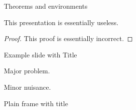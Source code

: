 \documentclass{beamer}
\begin{document}
\begin{frame}{Theorems and environments}
\begin{theorem}
This presentation is essentially useless.
\end{theorem}
\begin{proof}
This proof is essentially incorrect.
\end{proof}
\end{frame}

\begin{frame}{Example slide with Title}
\begin{example}
Major problem.
\end{example}
\begin{solution}
Minor nuisance.
\end{solution}
\end{frame}

\begin{frame}[plain]{Plain frame with title}
\lipsum[1]
\end{frame}
\end{document}

